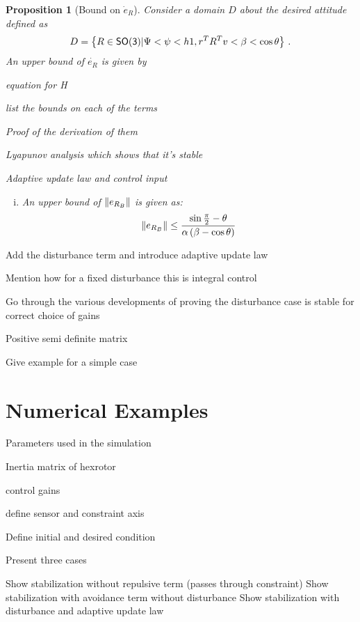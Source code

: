 \documentclass[letterpaper, 10 pt, conference]{ieeeconf}  %
\newtheorem{prop}{Proposition}
\begin{document}
\begin{prop}[Bound on \( \dot{e}_R \)]\label{prop:eR_dot_bound}
Consider a domain \( D \) about the desired attitude defined as
\begin{align}
	D = \left\{ R \in \mathsf{SO(3)} \vert \Psi < \psi < h1, r^T R^T v < \beta < \cos \theta \right\} \, . \label{eqn:domain}
\end{align}
An upper bound of \( \dot{e_R} \) is given by

equation for H

list the bounds on each of the terms

Proof of the derivation of them

Lyapunov analysis which shows that it's stable

Adaptive update law and control input

\begin{enumerate}[(i)]
	\item An upper bound of \( \left\| e_{R_B} \right\| \) is given as:
	\begin{align}
		\left\| e_{R_B} \right\| \leq \frac{\sin{\frac{\pi}{2} - \theta}}{\alpha \left( \beta - \cos \theta \right)}
	\end{align}
\end{enumerate}
\end{prop}
Add the disturbance term and introduce adaptive update law


Mention how for a fixed disturbance this is integral control 

Go through the various developments of proving the disturbance case is stable for correct choice of gains

Positive semi definite matrix

Give example for a simple case

\section{Numerical Examples}
Parameters used in the simulation

Inertia matrix of hexrotor

control gains

define sensor and constraint axis

Define initial and desired condition

Present three cases

Show stabilization without repulsive term (passes through constraint)
Show stabilization with avoidance term without disturbance
Show stabilization with disturbance and adaptive update law
\end{document}
